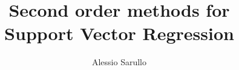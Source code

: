 \documentclass[english,laurea,twoside,10pt]{UFtesi}
\title{Second order methods for \\ \vspace{0.3em}Support Vector Regression}
\author{Alessio Sarullo}
\date{}
\begin{document}
\maketitle
\frontmatter



\tableofcontents
\mainmatter


\nocite{*}		 %
{}

\end{document}
